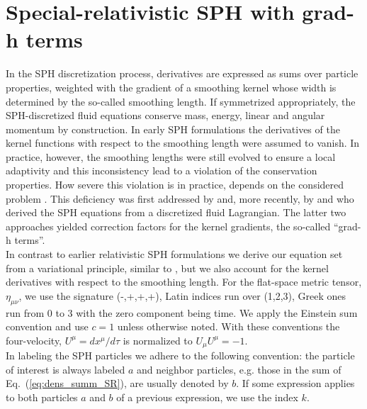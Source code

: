 \documentclass{elsart}
\begin{document}
 \section{Special-relativistic SPH with grad-h terms}
In the SPH discretization process, derivatives are expressed as 
sums over particle properties, weighted with the gradient of a smoothing kernel whose width is determined 
by the so-called smoothing length. If symmetrized appropriately, the SPH-discretized fluid equations 
conserve mass, energy, linear and angular momentum by construction. In early SPH formulations 
the derivatives of the kernel functions with respect to the smoothing length were assumed to vanish.
In practice, however, the smoothing lengths were still evolved to ensure a local adaptivity 
and this inconsistency lead to a violation of the conservation properties. How severe this violation is 
in practice, depends on the considered problem \cite{springel02,price04c,rosswog07c}.
This deficiency was first addressed by \cite{nelson94} and, more recently, by \cite{springel02} and 
\cite{monaghan02} who derived the SPH equations from a discretized fluid Lagrangian. The latter 
two approaches yielded correction factors for the kernel gradients, the so-called ``grad-h terms''.\\
In contrast to  earlier relativistic SPH formulations  \cite{kheyfets90,mann91,mann93,laguna93a,chow97,siegler00a} 
we derive our equation set  from a variational principle, similar to \cite{monaghan01},
but we also account for the kernel derivatives with respect to the smoothing length. For the flat-space metric tensor, 
$\eta_{\mu\nu}$, we use the signature (-,+,+,+), Latin indices run over 
(1,2,3), Greek ones run from 0 to 3 with the zero component being time. 
We apply the Einstein sum convention and use $c=1$ unless otherwise noted. 
With these conventions the four-velocity, $U^\mu=dx^\mu/d\tau$ is 
normalized to $U_\mu U^\mu=-1$.\\
In labeling the SPH particles we adhere to the following convention:
the particle of interest is always labeled $a$ and  neighbor particles,
e.g. those in the sum of Eq.~(\ref{eq:dens_summ_SR}), are usually denoted by $b$.
If some expression applies to both particles $a$ and $b$ of a previous expression,
we use the index $k$.
\end{document}
